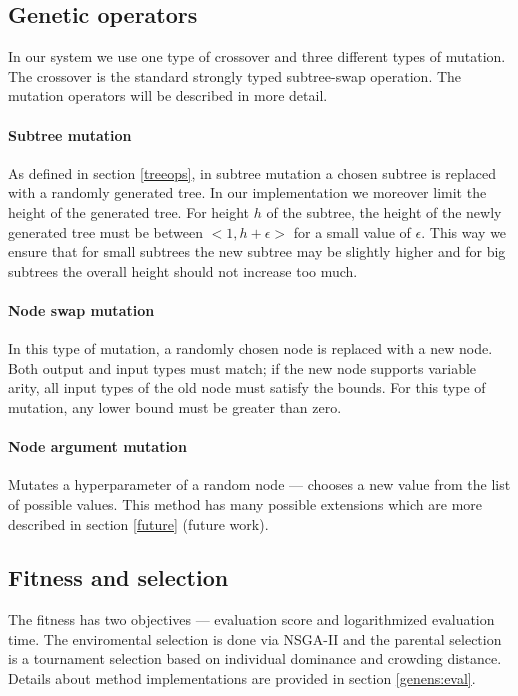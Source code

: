 \subsection{Genetic operators} \label{sec:repro}
In our system we use one type of crossover and three different types of
mutation. The crossover is the standard strongly typed subtree-swap operation.
The mutation operators will be described in more detail.

\paragraph{Subtree mutation}
As defined in section \ref{treeops}, in subtree mutation a chosen subtree is
replaced with a randomly generated tree. In our implementation we moreover
limit the height of the generated tree. For height $h$ of the subtree, the
height of the newly generated tree must be between $<1, h + \epsilon>$ for a
small value of $\epsilon$. This way we ensure that for small subtrees the new
subtree may be slightly higher and for big subtrees the overall height should
not increase too much.

\paragraph{Node swap mutation}
In this type of mutation, a randomly chosen node is replaced with a new node.
Both output and input types must match; if the new node supports variable
arity, all input types of the old node must satisfy the bounds. For this type
of mutation, any lower bound must be greater than zero.

\paragraph{Node argument mutation}
Mutates a hyperparameter of a random node --- chooses a new value from the list
of possible values. This method has many possible extensions which are more
described in section \ref{future} (future work).

\subsection{Fitness and selection} \label{sec:fitsel}

The fitness has two objectives --- evaluation score and logarithmized
evaluation time. The enviromental selection is done via NSGA-II and the 
parental selection is a tournament selection based on individual dominance and 
crowding distance. Details about method implementations are provided in 
section \ref{genens:eval}.


